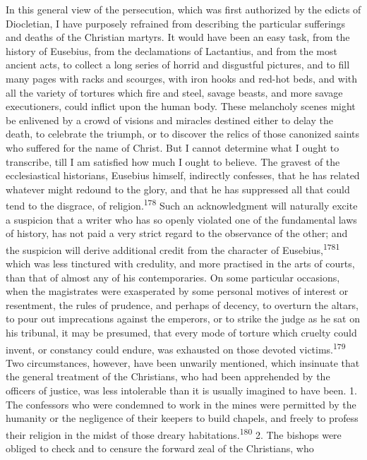 In this general view of the persecution, which was first
authorized by the edicts of Diocletian, I have purposely
refrained from describing the particular sufferings and deaths of
the Christian martyrs. It would have been an easy task, from the
history of Eusebius, from the declamations of Lactantius, and
from the most ancient acts, to collect a long series of horrid
and disgustful pictures, and to fill many pages with racks and
scourges, with iron hooks and red-hot beds, and with all the
variety of tortures which fire and steel, savage beasts, and more
savage executioners, could inflict upon the human body. These
melancholy scenes might be enlivened by a crowd of visions and
miracles destined either to delay the death, to celebrate the
triumph, or to discover the relics of those canonized saints who
suffered for the name of Christ. But I cannot determine what I
ought to transcribe, till I am satisfied how much I ought to
believe. The gravest of the ecclesiastical historians, Eusebius
himself, indirectly confesses, that he has related whatever might
redound to the glory, and that he has suppressed all that could
tend to the disgrace, of religion.\textsuperscript{178} Such an acknowledgment
will naturally excite a suspicion that a writer who has so openly
violated one of the fundamental laws of history, has not paid a
very strict regard to the observance of the other; and the
suspicion will derive additional credit from the character of
Eusebius,\textsuperscript{1781} which was less tinctured with credulity, and more
practised in the arts of courts, than that of almost any of his
contemporaries. On some particular occasions, when the
magistrates were exasperated by some personal motives of interest
or resentment, the rules of prudence, and perhaps of decency, to
overturn the altars, to pour out imprecations against the
emperors, or to strike the judge as he sat on his tribunal, it
may be presumed, that every mode of torture which cruelty could
invent, or constancy could endure, was exhausted on those devoted
victims.\textsuperscript{179} Two circumstances, however, have been unwarily
mentioned, which insinuate that the general treatment of the
Christians, who had been apprehended by the officers of justice,
was less intolerable than it is usually imagined to have been. 1.
The confessors who were condemned to work in the mines were
permitted by the humanity or the negligence of their keepers to
build chapels, and freely to profess their religion in the midst
of those dreary habitations.\textsuperscript{180} 2. The bishops were obliged to
check and to censure the forward zeal of the Christians, who
